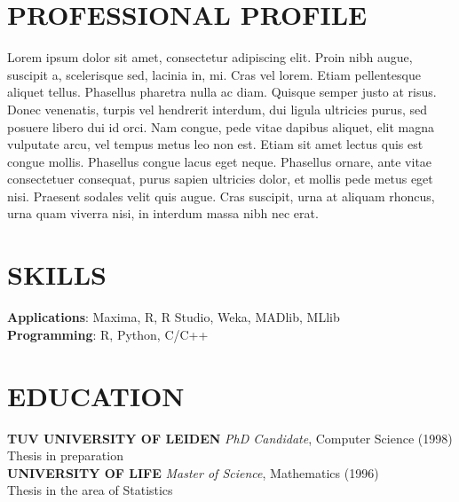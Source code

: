 \documentclass[a4paper, line, 11pt]{res} %
\begin{document}
 
 
\address{Applicant Address with Street, City, Zip Code\\Tel: +48 999 000 666}        
\address{E-mail: \href{mailto:e.mail@e.mail}{\nolinkurl{e.mail@e.mail}}\\ URL: \url{https://mysite.com}}
  
                        
\begin{resume}                         
 
\section{PROFESSIONAL PROFILE}  
  Lorem ipsum dolor sit amet, consectetur adipiscing elit. Proin nibh
  augue, suscipit a, scelerisque sed, lacinia in, mi. Cras vel lorem.
  Etiam pellentesque aliquet tellus. Phasellus pharetra nulla ac diam.
  Quisque semper justo at risus. Donec venenatis, turpis vel hendrerit
  interdum, dui ligula ultricies purus, sed posuere libero dui id orci.
  Nam congue, pede vitae dapibus aliquet, elit magna vulputate arcu, vel
  tempus metus leo non est. Etiam sit amet lectus quis est congue mollis.
  Phasellus congue lacus eget neque. Phasellus ornare, ante vitae
  consectetuer consequat, purus sapien ultricies dolor, et mollis pede
  metus eget nisi. Praesent sodales velit quis augue. Cras suscipit, urna
  at aliquam rhoncus, urna quam viverra nisi, in interdum massa nibh nec
  erat. 

\section{SKILLS}  

    \textbf{Applications}: Maxima, R, R Studio, Weka, MADlib, MLlib\\
    \textbf{Programming}: R, Python, C/C++

\section{EDUCATION} 

    \textbf{\uppercase{TUV University of Leiden}} \emph{PhD Candidate}, Computer Science (1998)\\ Thesis in preparation \\
    \textbf{\uppercase{University of life}} \emph{Master of Science}, Mathematics (1996)\\ Thesis in the area of Statistics 


\end{resume}
\end{document}

